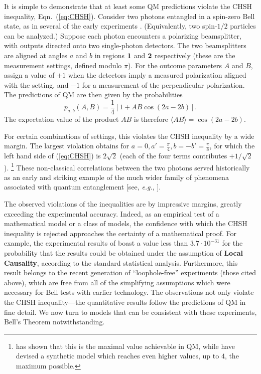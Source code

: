 \documentclass[rmp, aps, preprint, longbibliography]{revtex4-1}
\begin{document}
It is simple to demonstrate that at least some QM predictions violate the CHSH inequality, Eqn.~(\ref{eq:CHSH}).  Consider two photons entangled in a spin-zero Bell state, as in several of the early experiments \cite{clauser1978,aspect1981}.  (Equivalently, two spin-$1/2$ particles can be analyzed.)  Suppose each photon encounters a polarizing beamsplitter, with outputs directed onto two single-photon detectors.  The two beamsplitters are aligned at angles $a$ and $b$ in regions $\bf{1}$ and $\bf{2}$ respectively (these are the measurement settings, defined modulo $\pi$).  For the outcome parameters $A$ and $B$, assign a value of $+1$ when the detectors imply a measured polarization aligned with the setting, and $-1$ for a measurement of the perpendicular polarization.  The predictions of QM are then given by the probabilities
\begin{equation}
\label{eq:QMsinglet}
p_{a,b}(A,B) = \frac{1}{4} \left[ 1 + A B \cos(2a-2b) \right].
\end{equation}
The expectation value of the product $AB$ is therefore $\langle A B \rangle=\cos(2a-2b)$.

For certain combinations of settings, this violates the CHSH inequality by a wide margin. The largest violation obtains for $a=0, a'=\frac{\pi}{4}, b=-b'=\frac{\pi}{8}$, for which the left hand side of (\ref{eq:CHSH}) is $2\sqrt{2}$ (each of the four terms contributes $+1/\sqrt{2}$).%
\footnote{\label{fn:Tsirelson}%
\textcite{cirelson1980} has shown that this is the maximal value achievable in QM, while \textcite{popescu1994} have devised a synthetic model which reaches even higher values, up to $4$, the maximum possible.}
These non-classical correlations between the two photons served historically as an early and striking example of the much wider family of phenomena associated with quantum entanglement [see, \emph{e.g.}, \textcite{brunner2014,streltsov2017}].

The observed violations of the inequalities are by impressive margins, greatly exceeding the experimental accuracy.  Indeed, as an empirical test of a mathematical model or a class of models, the confidence with which the CHSH inequality is rejected approaches the certainty of a mathematical proof.  For example, the experimental results of \textcite{giustina2015} boast a value less than $3.7 \cdot 10^{-31}$ for the probability that the results could be obtained under the assumption of {\bf Local Causality}, according to the standard statistical analysis.  Furthermore, this result belongs to the recent generation of ``loophole-free'' experiments (those cited above), which are free from all of the simplifying assumptions which were necessary for Bell tests with earlier technology.  The observations not only violate the CHSH inequality---the quantitative results follow the predictions of QM in fine detail.  We now turn to models that can be consistent with these experiments, Bell's Theorem notwithstanding.
\end{document}
